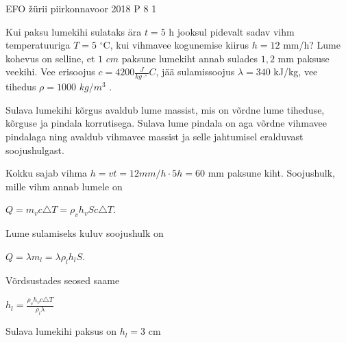 {EFO žürii} %
{piirkonnavoor} %
{2018} %
{P 8} %
{1} %
{

\ifStatement
Kui paksu lumekihi sulataks ära $t = 5$ h jooksul pidevalt sadav vihm temperatuuriga $T = 5$ $^{\circ}$C, kui vihmavee kogunemise kiirus $h = 12$ mm/h? Lume kohevus on selline, et $1$ $cm$ paksune lumekiht annab sulades $1,2$ mm paksuse veekihi. Vee erisoojus $c = 4200 \frac{J}{kg \cdot ^{\circ}}C$, jää sulamissoojus $\lambda = 340$ kJ/kg, vee tihedus $\rho = 1000$ $kg/m^3$ .
\fi

\ifHint
Sulava lumekihi kõrgus avaldub lume massist, mis on võrdne lume tiheduse, kõrguse ja pindala korrutisega. Sulava lume pindala on aga võrdne vihmavee pindalaga ning avaldub vihmavee massist ja selle jahtumisel eralduvast soojushulgast.
\fi

\ifSolution
Kokku sajab vihma $h = vt = 12 mm/h \cdot 5h = 60$ mm paksune kiht. Soojushulk, mille vihm annab lumele on
\begin{center}
$Q = m_v c \triangle T = \rho_v h_v Sc \triangle T$.
\end{center}
Lume sulamiseks kuluv soojushulk on
\begin{center}
$Q = \lambda m_l = \lambda \rho_l h_l S$.
\end{center}
Võrdsustades seosed saame 
\begin{center}
$h_l = \frac{\rho_v h_v c \triangle T}{\rho_l \lambda}$
\end{center}
Sulava lumekihi paksus on $h_l = 3$ cm
\fi
}